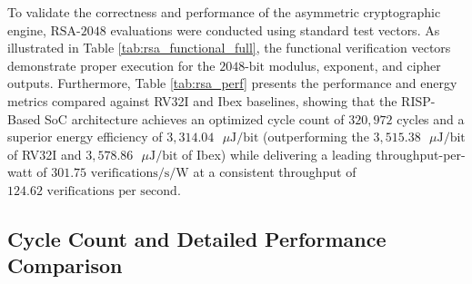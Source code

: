 To validate the correctness and performance of the asymmetric cryptographic engine, $\text{RSA}\text{-}2048$ evaluations were conducted using standard test vectors. As illustrated in Table \ref{tab:rsa_functional_full}, the functional verification vectors demonstrate proper execution for the $2048\text{-bit}$ modulus, exponent, and cipher outputs. Furthermore, Table \ref{tab:rsa_perf} presents the performance and energy metrics compared against RV32I and Ibex baselines, showing that the RISP-Based SoC architecture achieves an optimized cycle count of $320,972$ cycles and a superior energy efficiency of $3,314.04\text{ }\mu\text{J/bit}$ (outperforming the $3,515.38\text{ }\mu\text{J/bit}$ of RV32I and $3,578.86\text{ }\mu\text{J/bit}$ of Ibex) while delivering a leading throughput-per-watt of $301.75\text{ verifications/s/W}$ at a consistent throughput of $124.62\text{ verifications per second}$.


\subsection{Cycle Count and Detailed Performance Comparison}

